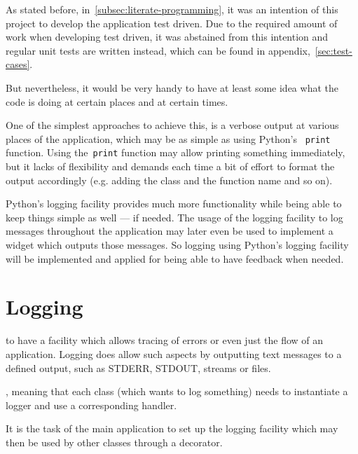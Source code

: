 \documentclass[%
    a4paper,    %
    justified,  %
    nobib,      %
    openany     %
]{tufte-book}
\makeatletter
\renewcommand{\label}[1]{\@tufte@label{##1}}%
\makeatother
\begin{document}
As stated before, in~\autoref{subsec:literate-programming}, it was an intention
of this project to develop the application test driven. Due to the required amount
of work when developing test driven, it was abstained from this intention and
regular unit tests are written instead, which can be found in
appendix,~\autoref{sec:test-cases}.

But nevertheless, it would be very handy to have at least some idea what the
code is doing at certain places and at certain times.

One of the simplest approaches to achieve this, is a verbose output at various
places of the application, which may be as simple as using Python's
~\verb=print= function. Using the~\verb=print= function may allow
printing something immediately, but it lacks of flexibility and demands each
time a bit of effort to format the output accordingly (e.g. adding the class and
the function name and so on).

Python's logging facility provides much more functionality while being able to
keep things simple as well --- if needed. The usage of the logging facility to
log messages throughout the application may later even be used to implement a
widget which outputs those messages. So logging using Python's logging facility
will be implemented and applied for being able to have feedback when needed.%

\chapter{Logging}
\label{appendix:chap:logging}

 to have a facility which allows tracing of
errors or even just the flow of an application. Logging does allow such aspects
by outputting text messages to a defined output, such as STDERR, STDOUT, streams
or files.

, meaning that each class
(which wants to log something) needs to instantiate a logger and use a
corresponding handler.

 It is the task
of the main application to set up the logging facility which may then be used by
other classes through a decorator.
\end{document}
